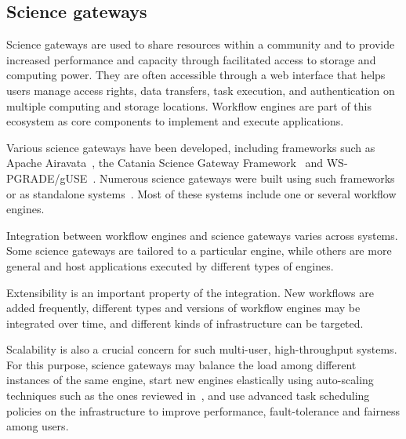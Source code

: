 \documentclass[preprint,3p,twocolumn]{elsarticle}
\newcommand{\note}[2]{\pdfmargincomment[color=yellow,author=#1,open=true]{#2}}
\newcommand{\closednote}[4]{} %
\begin{document}
\subsection{Science gateways}

\label{sec:intro_sg}

Science gateways are used to share resources within a community and to
provide increased performance and capacity through facilitated access
to storage and computing power. They are often accessible through a
web interface that helps users manage access rights, data transfers,
task execution, and authentication on multiple computing and storage
locations. Workflow engines are part of this ecosystem as core
components to implement and execute
applications. \closednote{Naj}{provide examples?}{Tristan}{Examples
  are mentioned in the last paragraph of this section. Moved it next.}

Various science gateways have been developed, including frameworks
such as Apache Airavata~\cite{marru2011apache}, the Catania Science
Gateway Framework~\cite{ardizzone2012decide} and
WS-PGRADE/gUSE~\cite{Kacsuk2012}. Numerous science gateways were built
using such frameworks~\cite{kacsuk2014science,ardizzone2012decide} or
as standalone systems~\cite{SHER-14,GLAT-13}. Most of these systems
include one or several workflow engines.


Integration between workflow engines and science gateways varies
across systems. Some science gateways are tailored to a particular
engine, while others are more general and host applications
executed by different types of engines. %

Extensibility is an important property of the integration. New
workflows are added frequently, different types and versions of
workflow engines may be integrated over time, and different kinds of
infrastructure can be targeted. 

Scalability is also a crucial concern for such multi-user,
high-throughput systems. For this purpose, science gateways may
balance the load among different instances of the same engine, start
new engines elastically using auto-scaling techniques such as the ones
reviewed in~\cite{lorido2012auto}, and use advanced task scheduling
policies on the infrastructure to improve performance, fault-tolerance
and fairness among users.
\end{document}

